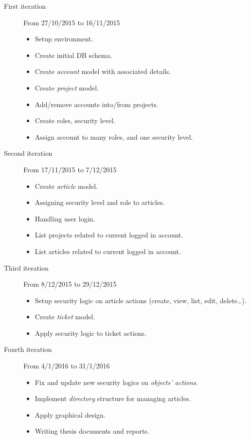 \begin{description}
\item[First iteration]
From 27/10/2015 to 16/11/2015
\begin{itemize}
\item Setup environment. 
\item Create initial DB schema. 
\item Create \emph{account} model with associated details. 
\item Create \emph{project} model. 
\item Add/remove accounts into/from projects. 
\item Create roles, security level. 
\item Assign account to many roles, and one security level.
\end{itemize}

\item[Second iteration]
From 17/11/2015 to 7/12/2015
\begin{itemize}
\item Create \emph{article} model.
\item Assigning security level and role to articles. 
\item Handling user login.
\item List projects related to current logged in account.
\item List articles related to current logged in account.
\end{itemize}

\item[Third iteration]
From 8/12/2015 to 29/12/2015
\begin{itemize}
\item Setup security logic on article actions (\eg create, view, list, edit, delete\dots). 
\item Create \emph{ticket} model. 
\item Apply security logic to ticket actions.
\end{itemize}

\item[Fourth iteration]
From 4/1/2016 to 31/1/2016
\begin{itemize}
\item Fix and update new security logics on \emph{objects' actions}.
\item Implement \emph{directory} structure for managing articles.
\item Apply graphical design.
\item Writing thesis documents and reports.
\end{itemize}
\end{description}
 
